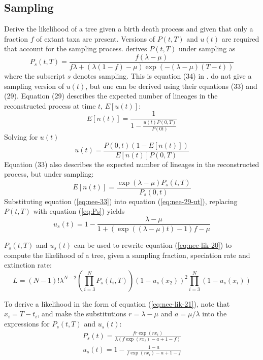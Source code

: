 \documentclass[12pt]{article}
\begin{document}
\subsection{Sampling}
Derive the likelihood of a tree given a birth death process and given
that only a fraction $f$ of extant taxa are present.  Versions of
$P(t,T)$ and $u(t)$ are required that account for the sampling
process.  \citet{Nee-1994-305} derives $P(t,T)$ under sampling as
\begin{equation}
  \label{eq:Ps}
  P_s(t,T) = \frac{f(\lambda - \mu)}{
    f\lambda + (\lambda(1-f) - \mu)\exp(-(\lambda - \mu)(T-t))}
\end{equation}
where the subscript $s$ denotes sampling.  This is equation (34) in
\citet{Nee-1994-305}.  \citet{Nee-1994-305} do not give a sampling version of
$u(t)$, but one can be derived using their equations (33) and (29).
%
Equation (29) describes the expected number of lineages in the
reconstructed process at time $t$, $E[u(t)]$:
\begin{equation}
  \label{eq:nee-29}
  E[n(t)] = \frac{1}{1 - \frac{u(t) P(0,T)}{P(0t)}}
\end{equation}
Solving for $u(t)$
\begin{equation}
  \label{eq:nee-29-ut}
  u(t) = \frac{P(0,t)(1 - E[n(t)])}{E[n(t)] P(0,T)}
\end{equation}
%
Equation (33) also describes the expected number of lineages in the
reconstructed process, but under sampling:
\begin{equation}
  \label{eq:nee-33}
  E[n(t)] = \frac{\exp(\lambda - \mu)P_s(t,T)}{P_s(0,t)}
\end{equation}
%
Substituting equation (\ref{eq:nee-33}) into equation
(\ref{eq:nee-29-ut}), replacing $P(t,T)$ with equation (\ref{eq:Ps})
yields
\begin{equation}
  \label{eq:us}
  u_s(t) = 1 - \frac{\lambda-\mu}{1 + (\exp((\lambda-\mu)t) - 1)f - \mu}
\end{equation}

$P_s(t,T)$ and $u_s(t)$ can be used to rewrite equation
(\ref{eq:nee-lik-20}) to compute the likelihood of a tree, given a
sampling fraction, speciation rate and extinction rate:
\begin{equation}
  \label{eq:nee-lik-20-sampled}
  L = (N-1)!\lambda^{N-2}
  \left(\prod_{i=3}^NP_s(t_i, T)\right)
  (1 - u_s(x_2))^2
  \prod_{i=3}^N(1-u_s(x_i))
\end{equation}

To derive a likelihood in the form of equation (\ref{eq:nee-lik-21}),
note that $x_i = T-t_i$, and make the substitutions $r = \lambda -
\mu$ and $a = \mu/\lambda$ into the expressions for $P_s(t, T)$ and
$u_s(t)$:
\begin{equation}
  \label{eq:nee-sampled-bits}
  \begin{split}
    P_s(t) = \frac{fr\exp(r x_i)}{\lambda(f \exp(r x_i) - a + 1 - f)}\\
    u_s(t) = 1 - \frac{1-a}{f \exp(r x_i) - a + 1 - f}
  \end{split}
\end{equation}
\end{document}
